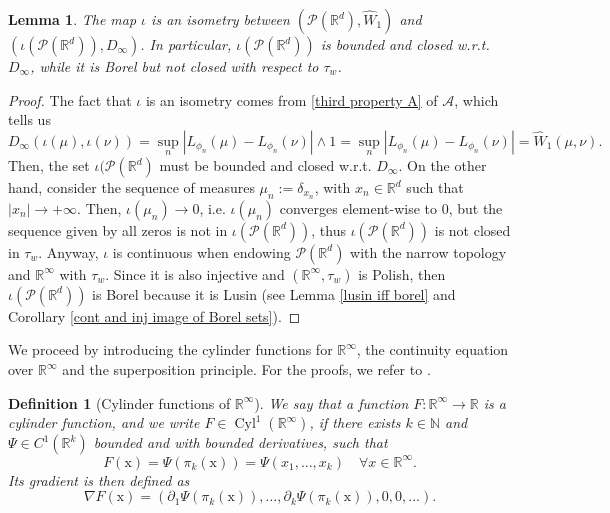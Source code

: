 \documentclass[10pt,leqno]{amsart}
\numberwithin{equation}{section}
\newtheorem{lemma}[teorema]{Lemma}
\newtheorem{df}[teorema]{Definition}
\newcommand{\R}{\mathbb{R}}
\newcommand{\N}{\mathbb{N}}
\newcommand{\PP}{\mathcal{P}}
\begin{document}
    \begin{lemma}\label{lemma: im of iota is closed}
        The map $\iota$ is an isometry between $(\PP(\R^d),\hat{W}_1)$ and $(\iota(\PP(\R^d)),D_\infty)$. In particular, $\iota(\PP(\R^d))$ is bounded and closed w.r.t. $D_\infty$, while it is Borel but not closed with respect to $\tau_w$.
    \end{lemma}

\begin{proof}
    The fact that $\iota$ is an isometry comes from \eqref{third property A} of $\mathcal{A}$, which tells us
    \[D_{\infty}(\iota(\mu),\iota(\nu)) = \sup_n |L_{\phi_n}(\mu) - L_{\phi_n}(\nu)| \wedge 1 =  \sup_n |L_{\phi_n}(\mu) - L_{\phi_n}(\nu)| = \hat{W}_1(\mu,\nu).\]
    Then, the set $\iota(\PP(\R^d)$ must be bounded and closed w.r.t. $
    D_\infty$. On the other hand, consider the sequence of measures $\mu_n := \delta_{x_n}$, with $x_n \in \R^d$ such that $|x_n|\to+\infty$. Then, $\iota(\mu_n) \to 0$, i.e. $\iota(\mu_n)$ converges element-wise to $0$, but the sequence given by all zeros is not in $\iota(\PP(\R^d))$, thus $\iota(\PP(\R^d))$ is not closed in $\tau_w$. Anyway, $\iota$ is continuous when endowing $\PP(\R^d)$ with the narrow topology and $\R^\infty$ with $\tau_w$. Since it is also injective and $(\R^\infty,\tau_w)$ is Polish, then $\iota(\PP(\R^d))$ is Borel because it is Lusin (see Lemma \ref{lusin iff borel} and Corollary \ref{cont and inj image of Borel sets}).
\end{proof}

We proceed by introducing the cylinder functions for $\R^\infty$, the continuity equation over $\R^\infty$ and the superposition principle. For the proofs, we refer to \cite[Chapter 7]{ambrosio2014well}.

\begin{df}[Cylinder functions of $\R^\infty$]\label{cylinder over R^infty}
    We say that a function $F:\R^\infty\to\R$ is a cylinder function, and we write $F\in \operatorname{Cyl}^1(\R^\infty)$, if there exists $k\in \N$ and $\Psi\in C^1(\R^k)$ bounded and with bounded derivatives, such that 
    \begin{equation}
        F(\mathrm{x}) = \Psi(\pi_k(\mathrm{x})) = \Psi(x_1,\dots,x_k) \quad \forall x\in \R^\infty.
    \end{equation}
    Its gradient is then defined as 
    \begin{equation}
        \nabla F(\mathrm{x}) = \left(\partial_1 \Psi(\pi_k(\mathrm{x})),\dots, \partial_k \Psi(\pi_k(\mathrm{x})), 0 ,0 ,\dots\right).
    \end{equation}
\end{df}
\end{document}
